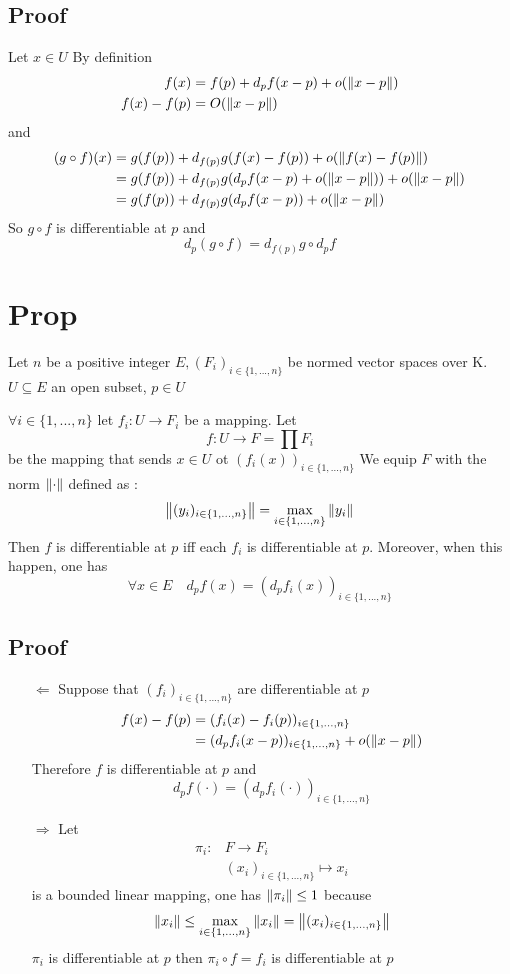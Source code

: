 \documentclass{book}
\begin{document}
\subsection*{Proof}
Let $x\in U$ By definition 
$$
\begin{aligned}
    f(x) &= f(p)+d_pf(x-p)+o(\left\lVert x-p \right\rVert)\\
    f(x)-f(p) &= O(\left\lVert x-p \right\rVert)
\end{aligned}$$
and $$
\begin{aligned}
    (g\circ f)(x) &= g(f(p))+d_{f(p)}g(f(x)-f(p))+o(\left\lVert f(x)-f(p) \right\rVert)\\
    &= g(f(p))+d_{f(p)}g(d_pf(x-p)+o(\left\lVert x-p \right\rVert))+o(\left\lVert x-p \right\rVert)\\
    &= g(f(p))+d_{f(p)}g(d_pf(x-p))+o(\left\lVert x-p \right\rVert)
\end{aligned}$$
So $g\circ f$ is differentiable at $p$ and $$d_p(g\circ f)=d_{f(p)}g\circ d_pf$$
\section{Prop}
Let $n$ be a positive integer $E,(F_i)_{i\in \{1,...,n\}}$ be normed vector spaces over K. $U\subseteq E$ an open subset, $p\in U$

$\forall i\in \{1,...,n\}$ let $f_i:U\rightarrow F_i$ be a mapping.
Let $$f:U\rightarrow F=\prod F_i$$
be the mapping that sends $x\in U$ ot $(f_i(x))_{i\in\{1,...,n\}}$ 
We equip $F$ with the norm $\left\lVert \cdot \right\rVert$ defined as :
$$\left\lVert (y_i)_{i\in \{1,...,n\}} \right\rVert=\max\limits_{i\in \{1,...,n\}}\left\lVert y_i \right\rVert$$
Then $f$ is differentiable at $p$ iff each $f_i$ is differentiable at $p$. Moreover, when this happen, one has $$\forall x\in E\quad d_pf(x)=(d_pf_i(x))_{i\in \{1,...,n\}}$$
\subsection*{Proof}
\begin{itemize}
    \item [$\Leftarrow$]Suppose that $(f_i)_{i\in \{1,...,n\}}$ are differentiable at $p$ 
    $$\begin{aligned}
        f(x)-f(p) &= (f_i(x)-f_i(p))_{i\in \{1,...,n\}}\\
        &= (d_pf_i(x-p))_{i\in \{1,...,n\}}+o(\left\lVert x-p \right\rVert)
    \end{aligned}$$
    Therefore $f$ is differentiable at $p$ and $$d_pf(\cdot)=(d_pf_i(\cdot))_{i\in \{1,...,n\}}$$
    \item[$\Rightarrow$]Let $$\begin{aligned}
        \pi_i: &F\rightarrow F_i\\
        &(x_i)_{i\in \{1,...,n\}}\mapsto x_i
    \end{aligned}$$ 
    is a bounded linear mapping, one has $\left\lVert \pi_i \right\rVert\leq 1$ because
    $$\left\lVert x_i \right\rVert\leq\max\limits_{i\in \{1,...,n\}}\left\lVert x_i \right\rVert=\left\lVert (x_i)_{i\in \{1,...,n\}} \right\rVert$$
    $\pi_i$ is differentiable at $p$ then $\pi_i\circ f=f_i$ is differentiable at $p$
\end{itemize}
\end{document}
